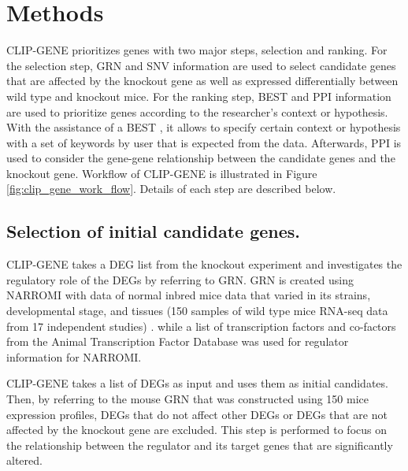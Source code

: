 \documentclass[oneside,phd]{snuthesis}
\begin{document}
\section{Methods}

CLIP-GENE prioritizes genes with two major steps, selection and ranking.
For the selection step, GRN and SNV information are used to select candidate genes that are affected by the knockout gene as well as expressed differentially between wild type and knockout mice. 
For the ranking step, BEST and PPI information are used to prioritize genes according to the researcher’s context or hypothesis. 
With the assistance of a BEST \citep{lee2016best}, it allows to specify certain context or hypothesis with a set of keywords by user that is expected from the data.
Afterwards, PPI is used to consider the gene-gene relationship between the candidate genes and the knockout gene.
Workflow of CLIP-GENE is illustrated in Figure \ref{fig:clip_gene_work_flow}.
Details of each step are described below.

\subsection{Selection of initial candidate genes.}

CLIP-GENE takes a DEG list from the knockout experiment and investigates the regulatory role of the DEGs by referring to GRN. 
GRN is created using NARROMI \citep{zhang2012narromi} with data of normal inbred mice data that varied in its strains, developmental stage, and tissues (150 samples of wild type mice RNA-seq data from 17 independent studies) \citep{yao2014corepressor, tena2014comparative, stilling2014k, srivastava2015astrocyte, shen2014tet3, roger2014otx2, ntziachristos2014contrasting, moniot2014prostaglandin, mielcarek2014dysfunction, liu2014pax5, kayo2014mir, harmacek2014unique, gu2014weak, deng2014single, bhatnagar2014genetic, altboum2014digital, alpern2014taf4}.
while a list of transcription factors and co-factors from the Animal Transcription Factor Database \citep{zhang2011animaltfdb} was used for regulator information for NARROMI.

CLIP-GENE takes a list of DEGs as input and uses them as initial candidates. 
Then, by referring to the mouse GRN that was constructed using 150 mice expression profiles, DEGs that do not affect other DEGs or DEGs that are not affected by the knockout gene are excluded. 
This step is performed to focus on the relationship between the regulator and its target genes that are significantly altered.
\end{document}
